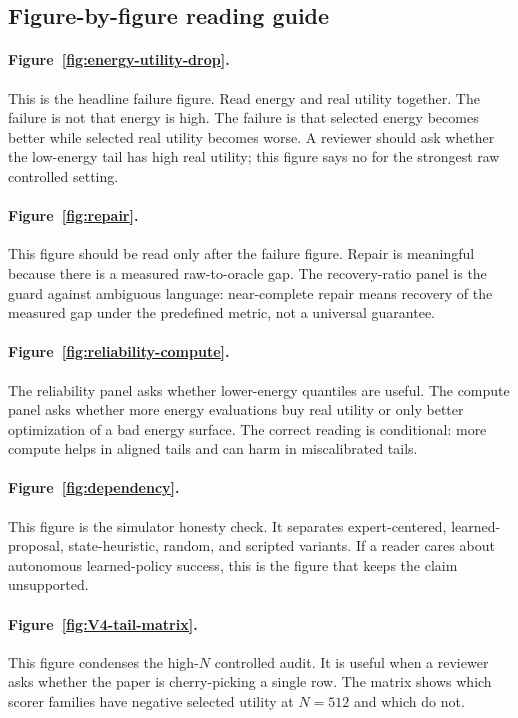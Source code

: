\subsection{Figure-by-figure reading guide}
\label{app:V4-figure-guide}

\paragraph{Figure~\ref{fig:energy-utility-drop}.}
This is the headline failure figure. Read energy and real utility together.
The failure is not that energy is high. The failure is that selected energy
becomes better while selected real utility becomes worse. A reviewer should
ask whether the low-energy tail has high real utility; this figure says no for
the strongest raw controlled setting.

\paragraph{Figure~\ref{fig:repair}.}
This figure should be read only after the failure figure. Repair is meaningful
because there is a measured raw-to-oracle gap. The recovery-ratio panel is the
guard against ambiguous language: near-complete repair means recovery of the
measured gap under the predefined metric, not a universal guarantee.

\paragraph{Figure~\ref{fig:reliability-compute}.}
The reliability panel asks whether lower-energy quantiles are useful. The
compute panel asks whether more energy evaluations buy real utility or only
better optimization of a bad energy surface. The correct reading is
conditional: more compute helps in aligned tails and can harm in miscalibrated
tails.

\paragraph{Figure~\ref{fig:dependency}.}
This figure is the simulator honesty check. It separates expert-centered,
learned-proposal, state-heuristic, random, and scripted variants. If a reader
cares about autonomous learned-policy success, this is the figure that keeps
the claim unsupported.

\paragraph{Figure~\ref{fig:V4-tail-matrix}.}
This figure condenses the high-\(N\) controlled audit. It is useful when a
reviewer asks whether the paper is cherry-picking a single row. The matrix
shows which scorer families have negative selected utility at \(N=512\) and
which do not.

